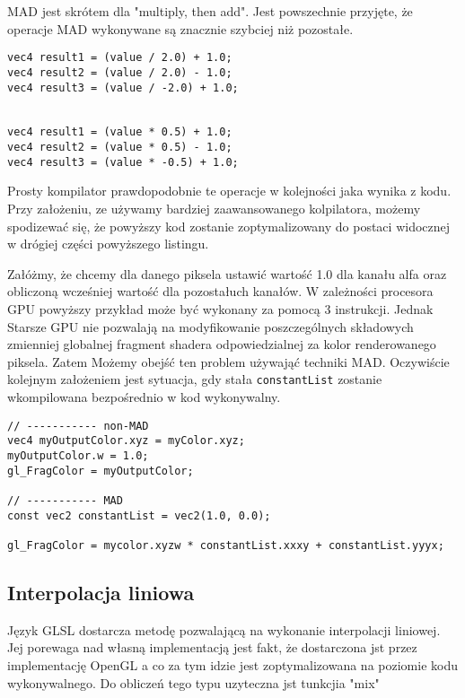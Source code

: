MAD jest skrótem dla "multiply, then add". Jest powszechnie przyjęte, że operacje MAD wykonywane są znacznie szybciej niż pozostałe.

\begin{lstlisting}[caption=Operacje MAD]
vec4 result1 = (value / 2.0) + 1.0;
vec4 result2 = (value / 2.0) - 1.0;
vec4 result3 = (value / -2.0) + 1.0;

 
vec4 result1 = (value * 0.5) + 1.0;
vec4 result2 = (value * 0.5) - 1.0;
vec4 result3 = (value * -0.5) + 1.0;
\end{lstlisting}

Prosty kompilator prawdopodobnie te operacje w kolejności jaka wynika z kodu. Przy założeniu, ze używamy bardziej zaawansowanego kolpilatora, możemy spodizewać się, że powyższy kod zostanie zoptymalizowany do postaci widocznej w drógiej części powyższego listingu.

Załóżmy, że chcemy dla danego piksela ustawić wartość 1.0 dla kanału alfa oraz obliczoną wcześniej wartość dla pozostałuch kanałów. W zależności procesora GPU powyższy przykład może być wykonany za pomocą 3 instrukcji. Jednak Starsze GPU nie pozwalają na modyfikowanie poszczególnych składowych zmienniej globalnej fragment shadera odpowiedzialnej za kolor renderowanego piksela. Zatem Możemy obejść ten problem używająć techniki MAD. Oczywiście kolejnym założeniem jest sytuacja, gdy stała \texttt{constantList} zostanie wkompilowana bezpośrednio w kod wykonywalny.

\begin{lstlisting}[caption=Przypisanie kanału alfa za pomocą oraz bez MAD]
// ----------- non-MAD
vec4 myOutputColor.xyz = myColor.xyz;
myOutputColor.w = 1.0;
gl_FragColor = myOutputColor;

// ----------- MAD
const vec2 constantList = vec2(1.0, 0.0);

gl_FragColor = mycolor.xyzw * constantList.xxxy + constantList.yyyx;
\end{lstlisting}


\subsection{Interpolacja liniowa}
\thispagestyle{empty}
\par\indent

Język GLSL dostarcza metodę pozwalającą na wykonanie interpolacji liniowej. Jej porewaga nad własną implementacją jest fakt, że dostarczona jst przez implementację OpenGL a co za tym idzie jest zoptymalizowana na poziomie kodu wykonywalnego. Do obliczeń tego typu uzyteczna jst tunkcjia "mix"

